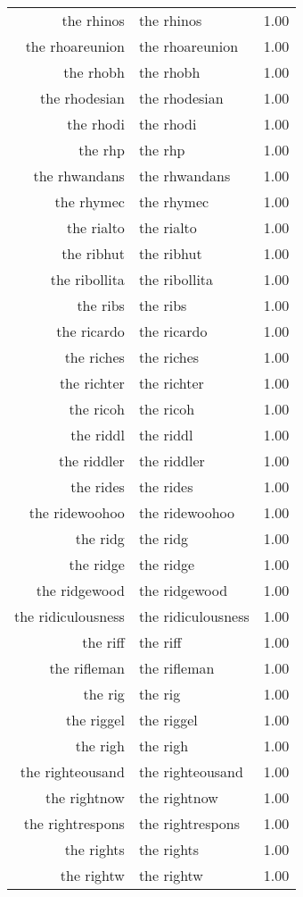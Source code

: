 \begin{table}[ht]
\begin{tabular}{rlr}
  the rhinos & the rhinos & 1.00 \\ 
  the rhoareunion & the rhoareunion & 1.00 \\ 
  the rhobh & the rhobh & 1.00 \\ 
  the rhodesian & the rhodesian & 1.00 \\ 
  the rhodi & the rhodi & 1.00 \\ 
  the rhp & the rhp & 1.00 \\ 
  the rhwandans & the rhwandans & 1.00 \\ 
  the rhymec & the rhymec & 1.00 \\ 
  the rialto & the rialto & 1.00 \\ 
  the ribhut & the ribhut & 1.00 \\ 
  the ribollita & the ribollita & 1.00 \\ 
  the ribs & the ribs & 1.00 \\ 
  the ricardo & the ricardo & 1.00 \\ 
  the riches & the riches & 1.00 \\ 
  the richter & the richter & 1.00 \\ 
  the ricoh & the ricoh & 1.00 \\ 
  the riddl & the riddl & 1.00 \\ 
  the riddler & the riddler & 1.00 \\ 
  the rides & the rides & 1.00 \\ 
  the ridewoohoo & the ridewoohoo & 1.00 \\ 
  the ridg & the ridg & 1.00 \\ 
  the ridge & the ridge & 1.00 \\ 
  the ridgewood & the ridgewood & 1.00 \\ 
  the ridiculousness & the ridiculousness & 1.00 \\ 
  the riff & the riff & 1.00 \\ 
  the rifleman & the rifleman & 1.00 \\ 
  the rig & the rig & 1.00 \\ 
  the riggel & the riggel & 1.00 \\ 
  the righ & the righ & 1.00 \\ 
  the righteousand & the righteousand & 1.00 \\ 
  the rightnow & the rightnow & 1.00 \\ 
  the rightrespons & the rightrespons & 1.00 \\ 
  the rights & the rights & 1.00 \\ 
  the rightw & the rightw & 1.00 \\ 

\end{tabular}
\end{table}
